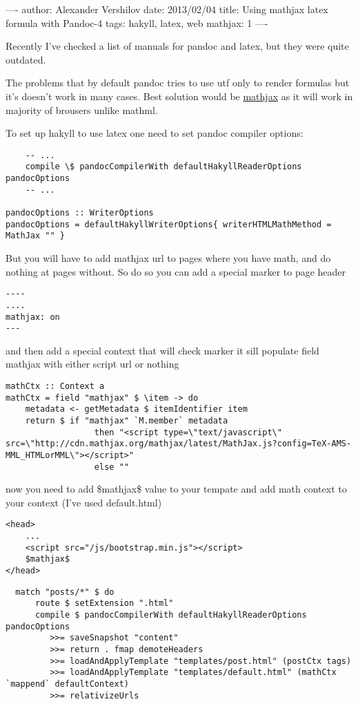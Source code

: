 ----
author: Alexander Vershilov
date: 2013/02/04
title: Using mathjax latex formula with Pandoc-4
tags: hakyll, latex, web
mathjax: 1
----

Recently I've checked a list of manuals for pandoc and latex, but they
were quite outdated.

The problems that by default pandoc tries to use utf only to render
formulas but it's doesn't work in many cases. Best solution would be
\href{http://www.mathjax.org/}{mathjax} as it will work in majority of
brousers unlike mathml.

To set up hakyll to use latex one need to set pandoc compiler options:

\begin{verbatim}
    -- ...
    compile \$ pandocCompilerWith defaultHakyllReaderOptions pandocOptions 
    -- ...

pandocOptions :: WriterOptions
pandocOptions = defaultHakyllWriterOptions{ writerHTMLMathMethod = MathJax "" }
\end{verbatim}

But you will have to add mathjax url to pages where you have math, and do
nothing at pages without. So do so you can add a special marker to page 
header

\begin{verbatim}
----
....
mathjax: on
---
\end{verbatim}

and then add a special context that will check marker it sill populate field
mathjax with either script url or nothing

\begin{verbatim}
mathCtx :: Context a
mathCtx = field "mathjax" $ \item -> do
    metadata <- getMetadata $ itemIdentifier item
    return $ if "mathjax" `M.member` metadata
                  then "<script type=\"text/javascript\" src=\"http://cdn.mathjax.org/mathjax/latest/MathJax.js?config=TeX-AMS-MML_HTMLorMML\"></script>"
                  else ""
\end{verbatim}

now you need to add \$mathjax\$ value to your tempate and add math context to
your context (I've used default.html)

\begin{verbatim}
<head>
    ...
    <script src="/js/bootstrap.min.js"></script>
    $mathjax$
</head>
\end{verbatim}

\begin{verbatim}
  match "posts/*" $ do
      route $ setExtension ".html"
      compile $ pandocCompilerWith defaultHakyllReaderOptions pandocOptions 
         >>= saveSnapshot "content"
         >>= return . fmap demoteHeaders
         >>= loadAndApplyTemplate "templates/post.html" (postCtx tags)
         >>= loadAndApplyTemplate "templates/default.html" (mathCtx `mappend` defaultContext)
         >>= relativizeUrls
\end{verbatim}

